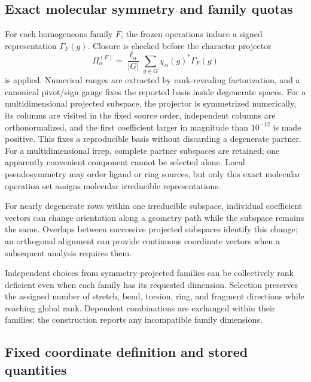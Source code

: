 \documentclass[10pt]{article}
\begin{document}
\subsection{Exact molecular symmetry and family quotas}

For each homogeneous family \(F\), the frozen operations induce a signed
representation \(\Gamma_F(g)\).  Closure is checked before the character
projector
\[
 \Pi_\alpha^{(F)}=
 \frac{\ell_\alpha}{|G|}\sum_{g\in G}
 \chi_\alpha(g)^*\Gamma_F(g)
\]
is applied.  Numerical ranges are extracted by rank-revealing factorization,
and a canonical pivot/sign gauge fixes the reported basis inside degenerate
spaces.  {For a multidimensional projected subspace, the projector
is symmetrized numerically, its columns are visited in the fixed source order,
independent columns are orthonormalized, and the first coefficient larger in
magnitude than \(10^{-12}\) is made positive.  This fixes a reproducible basis
without discarding a degenerate partner.}  For a multidimensional irrep, complete partner subspaces are retained;
one apparently convenient component cannot be selected alone.  Local
pseudosymmetry may order ligand or ring sources, but only this exact molecular
operation set assigns molecular irreducible representations.

{For nearly degenerate rows within one irreducible subspace,
individual coefficient vectors can change orientation along a geometry path
while the subspace remains the same. Overlaps between successive projected
subspaces identify this change; an orthogonal alignment can provide continuous
coordinate vectors when a subsequent analysis requires them.}

Independent choices from symmetry-projected families can be collectively rank
deficient even when each family has its requested dimension.  Selection preserves the assigned number of stretch, bend, torsion, ring, and
fragment directions while reaching global rank. Dependent combinations are
exchanged within their families; the construction reports any incompatible
family dimensions.

\subsection{Fixed coordinate definition and stored quantities}
\end{document}
